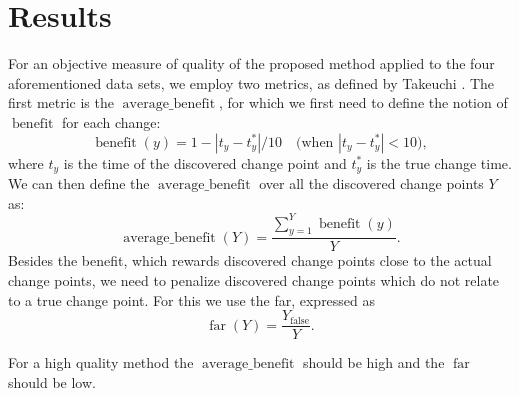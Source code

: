 \section{Results}\label{sec:artificial_data_results}
For an objective measure of quality of the proposed method applied to the four aforementioned data sets, we employ two metrics, as defined by Takeuchi \etal \cite{takeuchi2006unifying}.
The first metric is the $\operatorname*{average \_ benefit}$, for which we first need to define the notion of $\operatorname*{benefit}$ for each change:
\begin{equation}\label{eq:benefit}
  \operatorname*{benefit}(y) = 1 - |t_y - t_y^*| / 10  \mbox{~~~(when } |t_y - t_y^*| < 10 \mbox{)},
\end{equation}
where $t_y$ is the time of the discovered change point and $t_y^*$ is the true change time.
We can then define the $\operatorname*{average \_ benefit}$ over all the discovered change points $Y$ as:
\begin{equation}\label{eq:average_benefit}
  \operatorname*{average \_ benefit}(Y) = \frac{\sum_{y=1}^Y \operatorname*{benefit}(y)}{Y}.
\end{equation}
Besides the benefit, which rewards discovered change points close to the actual change points, we need to penalize discovered change points which do not relate to a true change point.
For this we use the \acrlong{far}, expressed as
\begin{equation}\label{eq:false_alarm_rate}
  \operatorname*{far}(Y) = \frac{Y_{\operatorname*{false}}}{Y}.
\end{equation}

For a high quality method the $\operatorname*{average\_benefit}$ should be high and the $\operatorname*{far}$ should be low.

